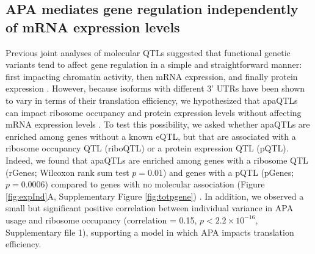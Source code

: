 \subsection{APA mediates gene regulation independently of mRNA expression levels}\label{APA-independent-expression}

Previous joint analyses of molecular QTLs suggested that functional genetic variants tend to affect gene regulation in a simple and straightforward manner: first impacting chromatin activity, then mRNA expression, and finally protein expression \citep{li_rna_2016, battle_genomic_2015}. However, because isoforms with different 3' UTRs have been shown to vary in terms of their translation efficiency, we hypothesized that apaQTLs can impact ribosome occupancy and protein expression levels without affecting mRNA expression levels \citep{floor_tunable_2016-1}. To test this possibility, we asked whether apaQTLs are enriched among genes without a known eQTL, but that are associated with a ribosome occupancy QTL (riboQTL) or a protein expression QTL (pQTL). Indeed, we found that apaQTLs are enriched among genes with a ribosome QTL (rGenes; Wilcoxon rank sum test $p=0.01$) and genes with a pQTL (pGenes; $p = 0.0006$) compared to genes with no molecular association (Figure \ref{fig:expInd}A, Supplementary Figure \ref{fig:totpgene}) \cite{li_rna_2016, battle_genomic_2015}. In addition, we observed a small but significant positive correlation between individual variance in APA usage and ribosome occupancy  (correlation = 0.15, $p <2.2\times10^{-16}$, Supplementary file 1), supporting a model in which APA impacts translation efficiency.

